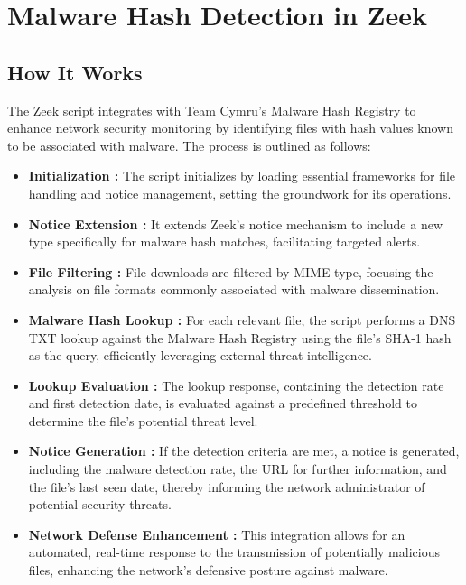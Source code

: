 
\section{Malware Hash Detection in Zeek}
\subsection{How It Works}
The Zeek script integrates with Team Cymru's Malware Hash Registry to enhance network security monitoring by identifying files with hash values known to be associated with malware. The process is outlined as follows:

\begin{itemize}

    \item \textbf{Initialization :} The script initializes by loading essential frameworks for file handling and notice management, setting the groundwork for its operations.
    \item \textbf{Notice Extension :} It extends Zeek's notice mechanism to include a new type specifically for malware hash matches, facilitating targeted alerts.
    \item \textbf{File Filtering :} File downloads are filtered by MIME type, focusing the analysis on file formats commonly associated with malware dissemination.
    \item \textbf{Malware Hash Lookup :} For each relevant file, the script performs a DNS TXT lookup against the Malware Hash Registry using the file's SHA-1 hash as the query, efficiently leveraging external threat intelligence.
    \item \textbf{Lookup Evaluation :} The lookup response, containing the detection rate and first detection date, is evaluated against a predefined threshold to determine the file's potential threat level.
    \item \textbf{Notice Generation :} If the detection criteria are met, a notice is generated, including the malware detection rate, the URL for further information, and the file's last seen date, thereby informing the network administrator of potential security threats.
    \item \textbf{Network Defense Enhancement :} This integration allows for an automated, real-time response to the transmission of potentially malicious files, enhancing the network's defensive posture against malware.
\end{itemize}


